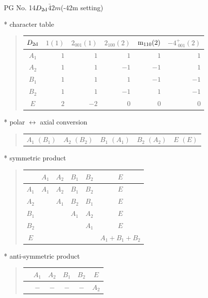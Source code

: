 \documentclass[fleqn,8pt,landscape]{jsarticle}
\begin{document}
\setcounter{MaxMatrixCols}{32}

\renewcommand{\tablename}{Table~}
\renewcommand{\figurename}{Figure~}
\begin{center}
\LARGE
PG No. 14\quad$D_{\rm 2d}$\quad$\bar{4}2m$\quad(-42m setting)\quad[ tetragonal ]
\end{center}

* character table
\begin{quote}
\begin{tabular}{crrrrr} \hline \hline
$ D_{\rm 2d} $ & $ 1(1) $ & $ 2{}_{001}(1) $ & $ 2{}_{100}(2) $ & $ {\rm m}_{110}(2) $ & $ -4^{+}_{\,\,001}(2) $ \\ \hline
$ A_{1} $ & $ 1 $ & $ 1 $ & $ 1 $ & $ 1 $ & $ 1 $ \\
$ A_{2} $ & $ 1 $ & $ 1 $ & $ -1 $ & $ -1 $ & $ 1 $ \\
$ B_{1} $ & $ 1 $ & $ 1 $ & $ 1 $ & $ -1 $ & $ -1 $ \\
$ B_{2} $ & $ 1 $ & $ 1 $ & $ -1 $ & $ 1 $ & $ -1 $ \\
$ E $ & $ 2 $ & $ -2 $ & $ 0 $ & $ 0 $ & $ 0 $ \\
 \hline \hline
\end{tabular}
\end{quote}

* polar $\leftrightarrow$ axial conversion
\begin{quote}
\begin{tabular}{ccccc}
$ A_{1}\,\,(B_{1}) $ & $ A_{2}\,\,(B_{2}) $ & $ B_{1}\,\,(A_{1}) $ & $ B_{2}\,\,(A_{2}) $ & $ E\,\,(E) $
\end{tabular}
\end{quote}

* symmetric product
\begin{quote}
\begin{tabular}{c|ccccc} \hline \hline
 & $ A_{1} $ & $ A_{2} $ & $ B_{1} $ & $ B_{2} $ & $ E $ \\ \hline
$ A_{1} $ & $ A_{1} $ & $ A_{2} $ & $ B_{1} $ & $ B_{2} $ & $ E $ \\
$ A_{2} $ & $  $ & $ A_{1} $ & $ B_{2} $ & $ B_{1} $ & $ E $ \\
$ B_{1} $ & $  $ & $  $ & $ A_{1} $ & $ A_{2} $ & $ E $ \\
$ B_{2} $ & $  $ & $  $ & $  $ & $ A_{1} $ & $ E $ \\
$ E $ & $  $ & $  $ & $  $ & $  $ & $ A_{1} + B_{1} + B_{2} $ \\
 \hline \hline
\end{tabular}
\end{quote}

* anti-symmetric product
\begin{quote}
\begin{tabular}{cccccc} \hline \hline
 & $ A_{1} $ & $ A_{2} $ & $ B_{1} $ & $ B_{2} $ & $ E $ \\ \hline
$  $ & $ - $ & $ - $ & $ - $ & $ - $ & $ A_{2} $ \\
 \hline \hline
\end{tabular}
\end{quote}
\end{document}
